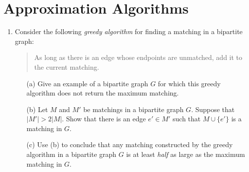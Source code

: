 \documentclass[12pt]{article}
\begin{document}
\begin{enumerate}
{}





\end{enumerate}

\section{Approximation Algorithms}


\begin{enumerate}


\item

Consider the following {\em greedy algorithm} for finding
a matching in a bipartite graph:
\begin{quote}
As long as there is an edge whose endpoints are unmatched,
add it to the current matching.
\end{quote}
\begin{itemize}
\item[(a)] Give an example of a bipartite graph $G$
for which this greedy algorithm does not return 
the maximum matching.
\item[(b)] Let $M$ and $M'$ be matchings in a bipartite graph $G$.
Suppose that $|M'| > 2 |M|$.  Show that there is an edge
$e' \in M'$ such that $M \cup \{e'\}$ is a matching in $G$.
\item[(c)] Use (b) to conclude that any matching constructed
by the greedy algorithm in a bipartite graph $G$
is at least {\em half} as large as the maximum matching in $G$.
\end{itemize}

\end{enumerate}
\end{document}
